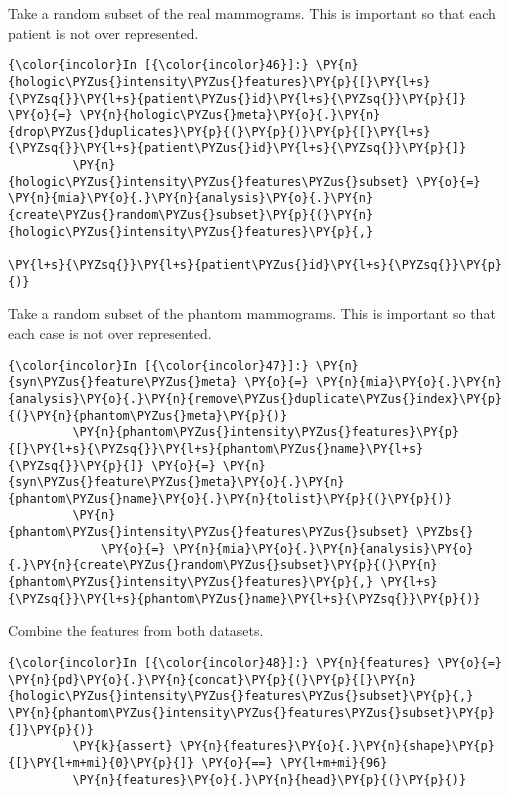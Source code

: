     Take a random subset of the real mammograms. This is important so that
each patient is not over represented.

    \begin{Verbatim}[commandchars=\\\{\}]
{\color{incolor}In [{\color{incolor}46}]:} \PY{n}{hologic\PYZus{}intensity\PYZus{}features}\PY{p}{[}\PY{l+s}{\PYZsq{}}\PY{l+s}{patient\PYZus{}id}\PY{l+s}{\PYZsq{}}\PY{p}{]} \PY{o}{=} \PY{n}{hologic\PYZus{}meta}\PY{o}{.}\PY{n}{drop\PYZus{}duplicates}\PY{p}{(}\PY{p}{)}\PY{p}{[}\PY{l+s}{\PYZsq{}}\PY{l+s}{patient\PYZus{}id}\PY{l+s}{\PYZsq{}}\PY{p}{]}
         \PY{n}{hologic\PYZus{}intensity\PYZus{}features\PYZus{}subset} \PY{o}{=} \PY{n}{mia}\PY{o}{.}\PY{n}{analysis}\PY{o}{.}\PY{n}{create\PYZus{}random\PYZus{}subset}\PY{p}{(}\PY{n}{hologic\PYZus{}intensity\PYZus{}features}\PY{p}{,}
                                                                               \PY{l+s}{\PYZsq{}}\PY{l+s}{patient\PYZus{}id}\PY{l+s}{\PYZsq{}}\PY{p}{)}
\end{Verbatim}

    Take a random subset of the phantom mammograms. This is important so
that each case is not over represented.

    \begin{Verbatim}[commandchars=\\\{\}]
{\color{incolor}In [{\color{incolor}47}]:} \PY{n}{syn\PYZus{}feature\PYZus{}meta} \PY{o}{=} \PY{n}{mia}\PY{o}{.}\PY{n}{analysis}\PY{o}{.}\PY{n}{remove\PYZus{}duplicate\PYZus{}index}\PY{p}{(}\PY{n}{phantom\PYZus{}meta}\PY{p}{)}
         \PY{n}{phantom\PYZus{}intensity\PYZus{}features}\PY{p}{[}\PY{l+s}{\PYZsq{}}\PY{l+s}{phantom\PYZus{}name}\PY{l+s}{\PYZsq{}}\PY{p}{]} \PY{o}{=} \PY{n}{syn\PYZus{}feature\PYZus{}meta}\PY{o}{.}\PY{n}{phantom\PYZus{}name}\PY{o}{.}\PY{n}{tolist}\PY{p}{(}\PY{p}{)}
         \PY{n}{phantom\PYZus{}intensity\PYZus{}features\PYZus{}subset} \PYZbs{}
             \PY{o}{=} \PY{n}{mia}\PY{o}{.}\PY{n}{analysis}\PY{o}{.}\PY{n}{create\PYZus{}random\PYZus{}subset}\PY{p}{(}\PY{n}{phantom\PYZus{}intensity\PYZus{}features}\PY{p}{,} \PY{l+s}{\PYZsq{}}\PY{l+s}{phantom\PYZus{}name}\PY{l+s}{\PYZsq{}}\PY{p}{)}
\end{Verbatim}

    Combine the features from both datasets.

    \begin{Verbatim}[commandchars=\\\{\}]
{\color{incolor}In [{\color{incolor}48}]:} \PY{n}{features} \PY{o}{=} \PY{n}{pd}\PY{o}{.}\PY{n}{concat}\PY{p}{(}\PY{p}{[}\PY{n}{hologic\PYZus{}intensity\PYZus{}features\PYZus{}subset}\PY{p}{,} \PY{n}{phantom\PYZus{}intensity\PYZus{}features\PYZus{}subset}\PY{p}{]}\PY{p}{)}
         \PY{k}{assert} \PY{n}{features}\PY{o}{.}\PY{n}{shape}\PY{p}{[}\PY{l+m+mi}{0}\PY{p}{]} \PY{o}{==} \PY{l+m+mi}{96}
         \PY{n}{features}\PY{o}{.}\PY{n}{head}\PY{p}{(}\PY{p}{)}
\end{Verbatim}

